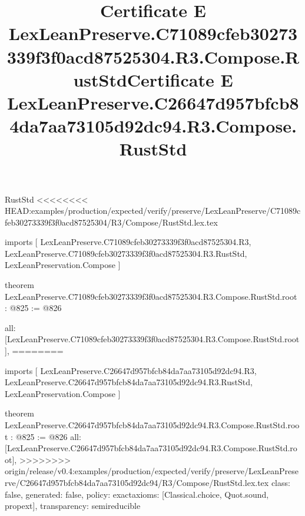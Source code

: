 \begin{lexlean}{RustStd}
<<<<<<<< HEAD:examples/production/expected/verify/preserve/LexLeanPreserve/C71089cfeb30273339f3f0acd87525304/R3/Compose/RustStd.lex.tex
\title{Certificate E LexLeanPreserve.C71089cfeb30273339f3f0acd87525304.R3.Compose.RustStd}
\begin{coremodule}
imports [
  LexLeanPreserve.C71089cfeb30273339f3f0acd87525304.R3,
  LexLeanPreserve.C71089cfeb30273339f3f0acd87525304.R3.RustStd,
  LexLeanPreservation.Compose
]

theorem LexLeanPreserve.C71089cfeb30273339f3f0acd87525304.R3.Compose.RustStd.root : @825 := @826 {
  all: [LexLeanPreserve.C71089cfeb30273339f3f0acd87525304.R3.Compose.RustStd.root],
========
\title{Certificate E LexLeanPreserve.C26647d957bfcb84da7aa73105d92dc94.R3.Compose.RustStd}
\begin{coremodule}
imports [
  LexLeanPreserve.C26647d957bfcb84da7aa73105d92dc94.R3,
  LexLeanPreserve.C26647d957bfcb84da7aa73105d92dc94.R3.RustStd,
  LexLeanPreservation.Compose
]

theorem LexLeanPreserve.C26647d957bfcb84da7aa73105d92dc94.R3.Compose.RustStd.root : @825 := @826 {
  all: [LexLeanPreserve.C26647d957bfcb84da7aa73105d92dc94.R3.Compose.RustStd.root],
>>>>>>>> origin/release/v0.4:examples/production/expected/verify/preserve/LexLeanPreserve/C26647d957bfcb84da7aa73105d92dc94/R3/Compose/RustStd.lex.tex
  class: false,
  generated: false,
  policy: exact{axioms: [Classical.choice, Quot.sound, propext]},
  transparency: semireducible
}


\end{coremodule}}
\end{coremodule}
\end{lexlean}
